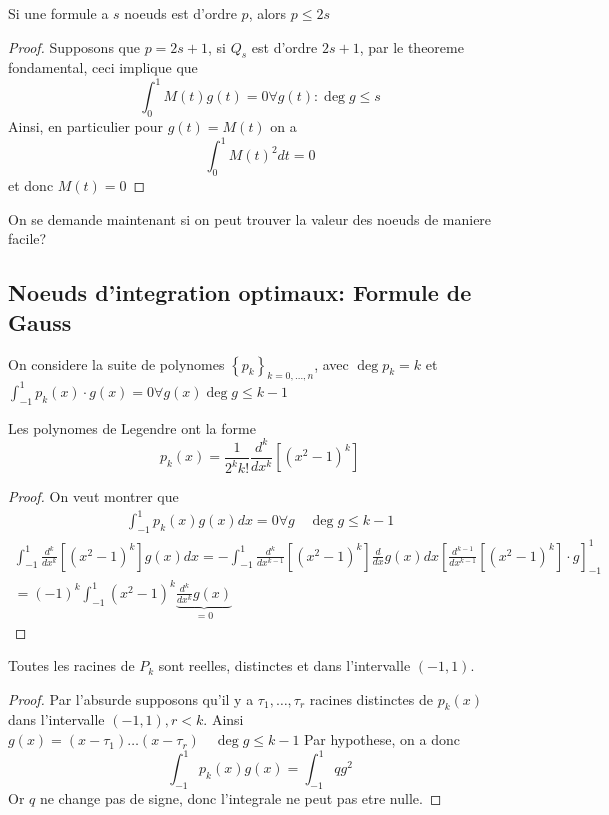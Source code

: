 \documentclass[../main.tex]{subfiles}
\begin{document}
\begin{lemma}
Si une formule a $s$ noeuds est d'ordre $p$, alors $p \leq 2s$ 
\end{lemma}
\begin{proof}
Supposons que $p = 2s+1$, si $Q_s$ est d'ordre $2s+1$, par le theoreme fondamental, ceci implique que
\[ 
\int_{ 0 }^{ 1 } M( t) g( t) =0 \forall g( t) : \deg g \leq s
\]
Ainsi, en particulier pour $g( t) = M( t) $ on a 
\[ 
\int_{ 0 }^{ 1 }M( t) ^{2} dt = 0 
\]
et donc $M( t)=0 $ 

\end{proof}
On se demande maintenant si on peut trouver la valeur des noeuds de maniere facile?
\subsection{Noeuds d'integration optimaux: Formule de Gauss}
\begin{defn}
	On considere la suite de polynomes $ \left\{ p_k \right\}_{k =0, \ldots, n} $, avec $\deg p_k = k$ et $ \int_{ -1 }^{ 1 } p_k( x) \cdot g( x) = 0 \forall g( x) \deg g \leq  k-1$ 
\end{defn}
\begin{thm}
	Les polynomes de Legendre ont la forme
	\[ 
		p_k( x) = \frac{1}{2^{k}k!} \frac{d^{k}}{dx^{k}}\left[( x^{2}-1)^{k}\right]
	\]
	
\end{thm}
\begin{proof}
	On veut montrer que
\begin{align*}
\int_{ -1 }^{ 1 }p_k ( x) g( x) dx = 0 \forall g \quad \deg g \leq k-1
\end{align*}
\begin{align*}
\int_{ -1 }^{ 1 } \frac{d^{k}}{dx^{k}} [ ( x^{2}-1) ^{k}] g( x) dx = - \int_{ -1 }^{ 1 } \frac{d^{k}}{dx^{k-1}} \left[ ( x^{2}-1)^{k} \right] \frac{d}{dx} g( x) dx \left[ \frac{d^{k-1}}{dx^{k-1}} [ ( x^{2}-1)^{k}]\cdot g \right]_{-1}^{1}\\
= ( -1) ^{k}\int_{ -1 }^{ 1 } ( x^{2}-1) ^{k} \underbrace{\frac{d^{k}}{dx^{k}}g( x)}_{=0} 
\end{align*}


\end{proof}
\begin{thm}
	Toutes les racines de $P_k$ sont reelles, distinctes et dans l'intervalle $( -1,1) $.
\end{thm}
\begin{proof}
Par l'absurde supposons qu'il y a $\tau_1,\ldots, \tau_r$ racines distinctes de $p_k( x) $ dans l'intervalle $( -1,1) , r <k$.
Ainsi $g( x) = ( x-\tau_1) \ldots ( x- \tau_r) \quad \deg g \leq k-1$ 
Par hypothese, on a donc
\[ 
\int_{ -1 }^{ 1 } p_k ( x) g( x) = \int_{ -1 }^{ 1 } q g^{2} 
\]
Or $q$ ne change pas de signe, donc l'integrale ne peut pas etre nulle.
\end{proof}
\end{document}
